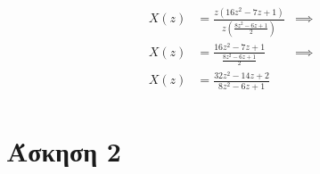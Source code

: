 \documentclass[12pt]{turabian-researchpaper}
\begin{document}
\begin{equation*}
\begin{aligned}
        X(z)           & = \frac{z(16z^2-7z+1)}{z(\frac{8z^2-6z+1}{2})}                                        & \implies                                                \\
        X(z)           & = \frac{16z^2-7z+1}{\frac{8z^2-6z+1}{2}}                                              & \implies                                                \\
        X(z)           & = \frac{32z^2-14z+2}{8z^2-6z+1}                                                                                                                 \\
    \end{aligned}
\end{equation*}

\newpage\section{Άσκηση 2}
\end{document}
